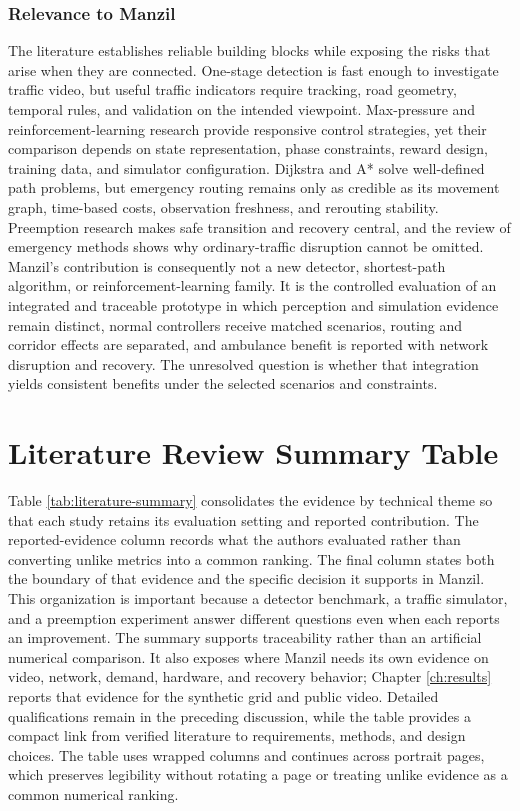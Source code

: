 \subsubsection{Relevance to Manzil}

The literature establishes reliable building blocks while exposing the risks that arise when they are connected. One-stage detection is fast enough to investigate traffic video, but useful traffic indicators require tracking, road geometry, temporal rules, and validation on the intended viewpoint. Max-pressure and reinforcement-learning research provide responsive control strategies, yet their comparison depends on state representation, phase constraints, reward design, training data, and simulator configuration. Dijkstra and A* solve well-defined path problems, but emergency routing remains only as credible as its movement graph, time-based costs, observation freshness, and rerouting stability. Preemption research makes safe transition and recovery central, and the review of emergency methods shows why ordinary-traffic disruption cannot be omitted. Manzil's contribution is consequently not a new detector, shortest-path algorithm, or reinforcement-learning family. It is the controlled evaluation of an integrated and traceable prototype in which perception and simulation evidence remain distinct, normal controllers receive matched scenarios, routing and corridor effects are separated, and ambulance benefit is reported with network disruption and recovery. The unresolved question is whether that integration yields consistent benefits under the selected scenarios and constraints.

\section{Literature Review Summary Table}

Table \ref{tab:literature-summary} consolidates the evidence by technical theme so that each study retains its evaluation setting and reported contribution. The reported-evidence column records what the authors evaluated rather than converting unlike metrics into a common ranking. The final column states both the boundary of that evidence and the specific decision it supports in Manzil. This organization is important because a detector benchmark, a traffic simulator, and a preemption experiment answer different questions even when each reports an improvement. The summary supports traceability rather than an artificial numerical comparison. It also exposes where Manzil needs its own evidence on video, network, demand, hardware, and recovery behavior; Chapter \ref{ch:results} reports that evidence for the synthetic grid and public video. Detailed qualifications remain in the preceding discussion, while the table provides a compact link from verified literature to requirements, methods, and design choices. The table uses wrapped columns and continues across portrait pages, which preserves legibility without rotating a page or treating unlike evidence as a common numerical ranking.


